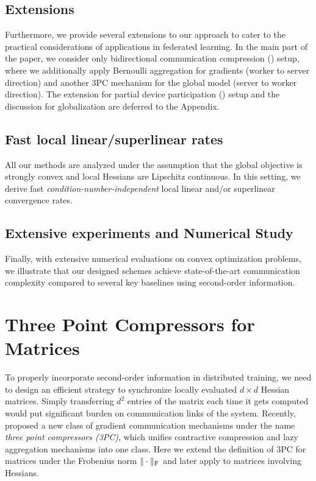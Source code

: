 \documentclass[11pt]{article}
\begin{document}
	
	\subsection{Extensions}
	Furthermore, we provide several extensions to our approach to cater to the practical considerations of applications in federated learning. In the main part of the paper, we consider only bidirectional communication compression () setup, where we additionally apply Bernoulli aggregation for gradients (worker to server direction) and another 3PC mechanism for the global model (server to worker direction). The extension for partial device participation () setup and the discussion for globalization are deferred to the Appendix.
	
	
	\subsection{Fast local linear/superlinear rates}
	All our methods are analyzed under the assumption that the global objective is strongly convex and local Hessians are Lipschitz continuous. In this setting, we derive fast {\em condition-number-independent} local linear and/or superlinear convergence rates.
	
	
	\subsection{Extensive experiments and Numerical Study}
	Finally, with extensive numerical evaluations on convex optimization problems, we illustrate that our designed schemes achieve state-of-the-art communication complexity compared to several key baselines using second-order information.
	
	
	
	\section{Three Point Compressors for Matrices}\label{sec:3PC4M}
	
	To properly incorporate second-order information in distributed training, we need to design an efficient strategy to synchronize locally evaluated $d\times d$ Hessian matrices. Simply transferring $d^2$ entries of the matrix each time it gets computed would put significant burden on communication links of the system. Recently, \citet{richtarik3PC} proposed a new class of gradient communication mechanisms under the name {\em three point compressors (3PC)}, which unifies contractive compression and lazy aggregation mechanisms into one class. Here we extend the definition of 3PC for matrices under the Frobenius norm $\|\cdot\|_{\rm F}$ and later apply to matrices involving Hessians.
	
\end{document}
